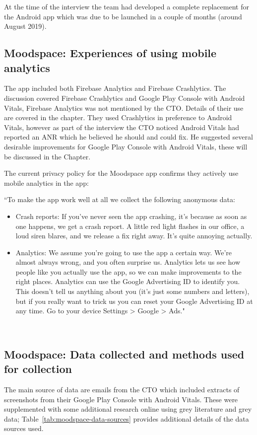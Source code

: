 At the time of the interview the team had developed a complete replacement for the Android app which was due to be launched in a couple of months (around August 2019).

\subsection{Moodspace: Experiences of using mobile analytics}
The app included both Firebase Analytics and Firebase Crashlytics. The discussion covered Firebase Crashlytics and Google Play Console with Android Vitals, Firebase Analytics was not mentioned by the CTO. Details of their use are covered in the  chapter. They used Crashlytics in preference to Android Vitals, however as part of the interview the CTO noticed Android Vitals had reported an ANR which he believed he should and could fix. He suggested several desirable improvements for Google Play Console with Android Vitals, these will be discussed in the  Chapter.

The current privacy policy for the Moodspace app confirms they actively use mobile analytics in the app: 

{\small
``To make the app work well at all we collect the following anonymous data:
    \begin{itemize}
        \itemsep0em
        \item Crash reports: If you've never seen the app crashing, it's because as soon as one happens, we get a crash report. A little red light flashes in our office, a loud siren blares, and we release a fix right away. It's quite annoying actually.
        \item Analytics: We assume you're going to use the app a certain way. We're almost always wrong, and you often surprise us. Analytics lets us see how people like you actually use the app, so we can make improvements to the right places. Analytics can use the Google Advertising ID to identify you. This doesn't tell us anything about you (it's just some numbers and letters), but if you really want to trick us you can reset your Google Advertising ID at any time. Go to your device Settings > Google > Ads."
    \end{itemize}~\citep{moodspace2021_privacy_policy}
}

\subsection{Moodspace: Data collected and methods used for collection}
The main source of data are emails from the CTO which included extracts of screenshots from their Google Play Console with Android Vitals. These were supplemented with some additional research online using grey literature and grey data; Table~\ref{tab:moodspace-data-sources} provides additional details of the data sources used.

